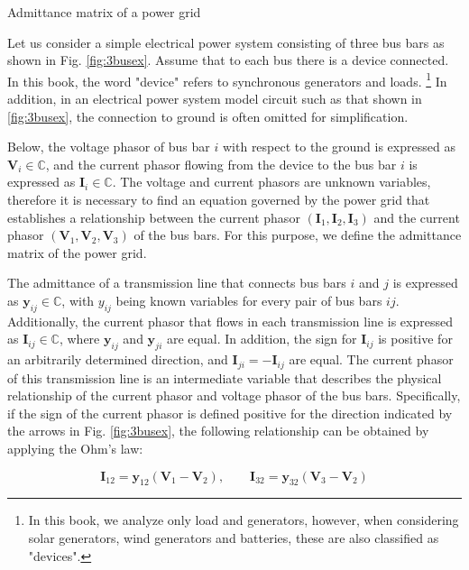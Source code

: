 \documentclass[graybox, envcountchap]{svmult}
\begin{document}
\begin{example}{Admittance matrix of a power grid}\label{ex:derY}

  Let us consider a simple electrical power system consisting of three bus bars as
  shown in Fig. \ref{fig:3busex}. Assume that to each bus there is a device
  connected. In this book, the word "device" refers to synchronous generators and
  loads. \footnote{In this book, we analyze only load and generators, however,
  when considering solar generators, wind generators and batteries, these are also
  classified as "devices".} In addition, in an electrical power system model
  circuit such as that shown in \ref{fig:3busex}, the connection to ground is
  often omitted for simplification.

  Below, the voltage phasor of bus bar $i$ with respect to the ground is expressed
  as $\bm{V}_i \in \mathbb{C}$, and the current phasor flowing from the device to
  the bus bar $i$ is expressed as $\bm{I}_i \in \mathbb{C}$. The voltage and
  current phasors are unknown variables, therefore it is necessary to find an
  equation governed by the power grid that establishes a relationship between the
  current phasor $(\bm{I}_1,\bm{I}_2,\bm{I}_3)$ and the current phasor
  $(\bm{V}_1,\bm{V}_2,\bm{V}_3)$ of the bus bars. For this purpose, we define the
  admittance matrix of the power grid. 

  The admittance of a transmission line that connects bus bars $i$ and $j$ is
  expressed as $\bm{y}_{ij}\in \mathbb{C}$, with $y_{ij}$ being known variables
  for every pair of bus bars $ij$. Additionally, the current phasor that flows in
  each transmission line is expressed as $\bm{I}_{ij}\in \mathbb{C}$, where
  $\bm{y}_{ij}$ and $\bm{y}_{ji}$ are equal. In addition, the sign for
  $\bm{I}_{ij}$ is positive for an arbitrarily determined direction, and
  $\bm{I}_{ji} = -\bm{I}_{ij}$ are equal. The current phasor of this transmission
  line is an intermediate variable that describes the physical relationship of the
  current phasor and voltage phasor of the bus bars. Specifically, if the sign of
  the current phasor is defined positive for the direction indicated by the arrows
  in Fig. \ref{fig:3busex}, the following relationship can be obtained by applying
  the Ohm's law:

  \begin{equation*}
  \bm{I}_{12}=\bm{y}_{12}(\bm{V}_{1}-\bm{V}_{2}),\qquad
  \bm{I}_{32}=\bm{y}_{32}(\bm{V}_{3}-\bm{V}_{2})
  \end{equation*}



\end{example}
\end{document}
